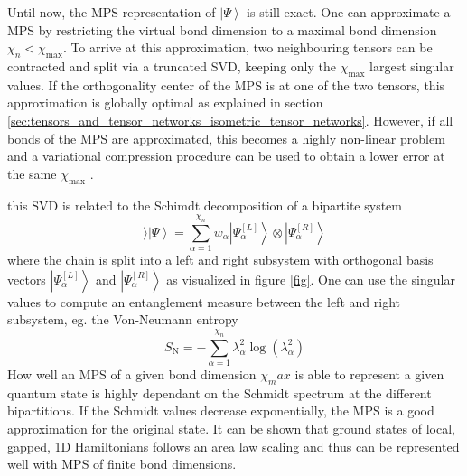 Until now, the MPS representation of $\left|\Psi\right\rangle$ is still exact. One can approximate a MPS by restricting the virtual bond dimension to a maximal bond dimension $\chi_n < \chi_\text{max}$. To arrive at this approximation, two neighbouring tensors can be contracted and split via a truncated SVD, keeping only the $\chi_\text{max}$ largest singular values. If the orthogonality center of the MPS is at one of the two tensors, this approximation is globally optimal as explained in section \ref{sec:tensors_and_tensor_networks_isometric_tensor_networks}. However, if all bonds of the MPS are approximated, this becomes a highly non-linear problem and a variational compression procedure can be used to obtain a lower error at the same $\chi_\text{max}$ \cite{cite:DMRG_in_the_age_of_MPS}.



this SVD is related to the Schimdt decomposition of a bipartite system
\begin{equation}\rangle
	\left|\Psi\right\rangle = \sum_{\alpha=1}^{\chi_n} w_\alpha \left| \Psi^{[L]}_\alpha\right\rangle \otimes \left|\Psi^{[R]}_\alpha\right\rangle
\end{equation}
where the chain is split into a left and right subsystem with orthogonal basis vectors $\left|\Psi^{[L]}_\alpha\right\rangle$ and $\left|\Psi^{[R]}_\alpha\right\rangle$ as visualized in figure \ref{fig}. One can use the singular values to compute an entanglement measure between the left and right subsystem, eg. the Von-Neumann entropy
\begin{equation}
	S_\text{N} = -\sum_{\alpha=1}^{\chi_n} \lambda_\alpha^2 \log\left(\lambda_\alpha^2\right)
\end{equation}
How well an MPS of a given bond dimension $\chi_max$ is able to represent a given quantum state is highly dependant on the Schmidt spectrum at the different bipartitions. If the Schmidt values decrease exponentially, the MPS is a good approximation for the original state. It can be shown \cite{bibid} that ground states of local, gapped, 1D Hamiltonians follows an area law scaling and thus can be represented well with MPS of finite bond dimensions.
